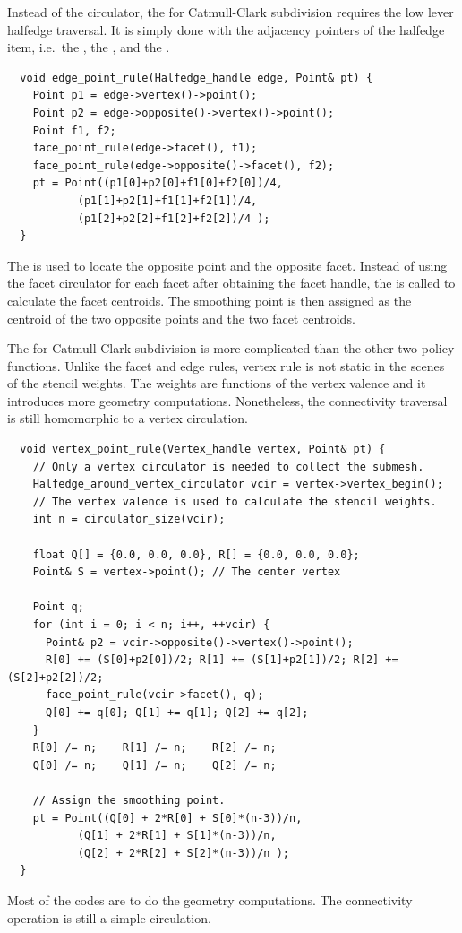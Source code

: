 Instead of the circulator, the  
for Catmull-Clark subdivision requires the low lever 
halfedge traversal. It is simply done with the adjacency 
pointers of the halfedge item, i.e.\ the ,
the , and the .
\begin{lstlisting}
  void edge_point_rule(Halfedge_handle edge, Point& pt) {
    Point p1 = edge->vertex()->point();
    Point p2 = edge->opposite()->vertex()->point();
    Point f1, f2;
    face_point_rule(edge->facet(), f1);
    face_point_rule(edge->opposite()->facet(), f2);
    pt = Point((p1[0]+p2[0]+f1[0]+f2[0])/4,
	       (p1[1]+p2[1]+f1[1]+f2[1])/4,
	       (p1[2]+p2[2]+f1[2]+f2[2])/4 );
  }
\end{lstlisting}
The  is used to locate the
opposite point and the opposite facet. Instead of using 
the facet circulator for each facet after obtaining
the facet handle, the  is called to 
calculate the facet centroids. The smoothing point is then 
assigned as the centroid of the two opposite points and the 
two facet centroids.

The  for Catmull-Clark subdivision
is more complicated than the other two policy functions. Unlike
the facet and edge rules, vertex rule is not static in the scenes
of the stencil weights. The weights are functions of the vertex 
valence and it introduces more geometry computations. 
Nonetheless, the connectivity traversal is still homomorphic to
a vertex circulation.  
\begin{lstlisting}
  void vertex_point_rule(Vertex_handle vertex, Point& pt) {
    // Only a vertex circulator is needed to collect the submesh.
    Halfedge_around_vertex_circulator vcir = vertex->vertex_begin();
    // The vertex valence is used to calculate the stencil weights.
    int n = circulator_size(vcir);

    float Q[] = {0.0, 0.0, 0.0}, R[] = {0.0, 0.0, 0.0};
    Point& S = vertex->point(); // The center vertex
    
    Point q;
    for (int i = 0; i < n; i++, ++vcir) {
      Point& p2 = vcir->opposite()->vertex()->point();
      R[0] += (S[0]+p2[0])/2; R[1] += (S[1]+p2[1])/2; R[2] += (S[2]+p2[2])/2;
      face_point_rule(vcir->facet(), q);
      Q[0] += q[0]; Q[1] += q[1]; Q[2] += q[2];
    }
    R[0] /= n;    R[1] /= n;    R[2] /= n;
    Q[0] /= n;    Q[1] /= n;    Q[2] /= n;
      
    // Assign the smoothing point.
    pt = Point((Q[0] + 2*R[0] + S[0]*(n-3))/n,
	       (Q[1] + 2*R[1] + S[1]*(n-3))/n,
	       (Q[2] + 2*R[2] + S[2]*(n-3))/n );
  }
\end{lstlisting}
Most of the codes are to do the geometry computations. The connectivity
operation is still a simple circulation.
\\

